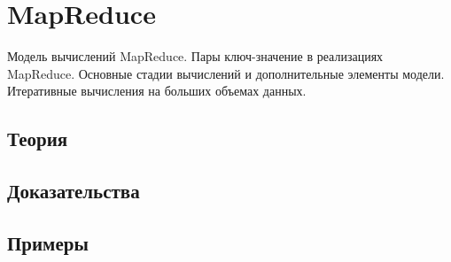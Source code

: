 
\section{MapReduce}
\label{sec:1.3.12-mapreduce}

\begin{ticket}
Модель вычислений MapReduce. Пары ключ-значение в реализациях MapReduce. Основные стадии вычислений и дополнительные элементы модели. Итеративные вычисления на больших объемах данных.
\end{ticket}

\subsection*{Теория}

\subsection*{Доказательства}

\subsection*{Примеры}
